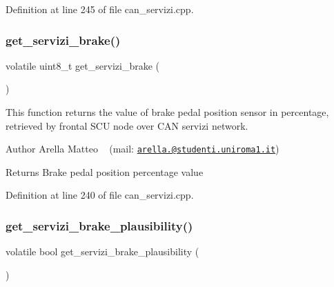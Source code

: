Definition at line 245 of file can\+\_\+servizi.\+cpp.

\mbox{\label{group___c_a_n__servizi__group_ga21c09880bef645f24962658ef3dbb16e}} 
\subsubsection{\texorpdfstring{get\+\_\+servizi\+\_\+brake()}{get\_servizi\_brake()}}
{\footnotesize\ttfamily volatile uint8\+\_\+t get\+\_\+servizi\+\_\+brake (\begin{DoxyParamCaption}{ }\end{DoxyParamCaption})}



This function returns the value of brake pedal position sensor in percentage, retrieved by frontal S\+CU node over C\+AN servizi network. 

\begin{DoxyAuthor}{Author}
Arella Matteo ~\newline
 (mail\+: \href{mailto:arella.1646983@studenti.uniroma1.it}{\tt arella.@studenti.\+uniroma1.\+it})
\end{DoxyAuthor}
\begin{DoxyReturn}{Returns}
Brake pedal position percentage value 
\end{DoxyReturn}


Definition at line 240 of file can\+\_\+servizi.\+cpp.

\mbox{\label{group___c_a_n__servizi__group_ga064fdc5f825b2d50b1b13509e3f135d2}} 
\subsubsection{\texorpdfstring{get\+\_\+servizi\+\_\+brake\+\_\+plausibility()}{get\_servizi\_brake\_plausibility()}}
{\footnotesize\ttfamily volatile bool get\+\_\+servizi\+\_\+brake\+\_\+plausibility (\begin{DoxyParamCaption}{ }\end{DoxyParamCaption})}



